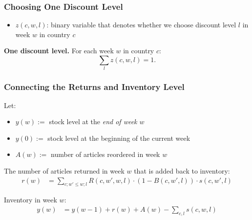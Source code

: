 \documentclass[xcolor=table]{beamer}
\begin{document}
\begin{frame}[t]
\frametitle{Choosing One Discount Level}
  \begin{itemize}
    \item $z(c, w, l)$: binary variable that denotes whether we choose discount
      level $l$ in week $w$ in country $c$
    \end{itemize}

    \bigskip

\textcolor{orange2}{\textbf{One discount level.}} For each week $w$ in country
$c$:
    \begin{equation*}
      \sum_{l} z(c, w, l) = 1.
    \end{equation*}
\end{frame}


\begin{frame}[t]
\frametitle{Connecting the Returns and Inventory Level}
  Let:
  \begin{itemize}
    \item $y(w) :=$ stock level at the \emph{end of week $w$} 
    \item $y(0) :=$ stock level at the beginning of the current week
    \item $A(w) := $ number of articles reordered in week $w$
  \end{itemize}

\bigskip

\pause

The number of articles returned in week $w$ that is added back to inventory:
\begin{align*}
  r(w) & = \sum_{c; w' \leq w; l} R(c, w', w, l) \cdot (1 - B(c, w', l)) \cdot
  s(c, w', l)
\end{align*}

Inventory in week $w$:
\begin{align*}
    y(w) & = y(w - 1) + r(w) + A(w) - \sum_{c, l} s(c, w, l)
\end{align*}
\end{frame}
\end{document}
